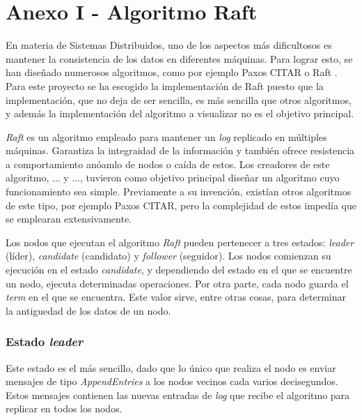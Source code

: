 \chapter*{Anexo I - Algoritmo Raft}

En materia de Sistemas Distribuidos, uno de los aspectos más dificultosos es mantener la consistencia de los datos en diferentes máquinas. Para lograr esto, se han diseñado numerosos algoritmos, como por ejemplo Paxos CITAR o Raft \cite{raft1}. Para este proyecto se ha escogido la implementación de Raft puesto que la implementación, que no deja de ser sencilla, es más sencilla que otros algoritmos, y además la implementación del algoritmo a visualizar no es el objetivo principal.

\textit{Raft} es un algoritmo empleado para mantener un \textit{log} replicado en múltiples máquinas. Garantiza la integraidad de la información y también ofrece resistencia a comportamiento anóamlo de nodos o caída de estos. Los creadores de este algoritmo, ... y ..., tuvieron como objetivo principal diseñar un algoritmo cuyo funcionamiento sea simple. Previamente a su invención, existían otros algoritmos de este tipo, por ejemplo Paxos CITAR, pero la complejidad de estos impedía que se emplearan extensivamente.

Los nodos que ejecutan el algoritmo \textit{Raft} pueden pertenecer a tres estados: \textit{leader} (líder), \textit{candidate} (candidato) y \textit{follower} (seguidor). Los nodos comienzan su ejecución en el estado \textit{candidate}, y dependiendo del estado en el que se encuentre un nodo, ejecuta determinadas operaciones. Por otra parte, cada nodo guarda el \textit{term} en el que se encuentra. Este valor sirve, entre otras cosas, para determinar la antiguedad de los datos de un nodo.

\subsection{Estado \textit{leader}}

Este estado es el más sencillo, dado que lo único que realiza el nodo es enviar mensajes de tipo \textit{AppendEntries} a los nodos vecinos cada varios decisegundos. Estos mensajes contienen las nuevas entradas de \textit{log} que recibe el algoritmo para replicar en todos los nodos.
